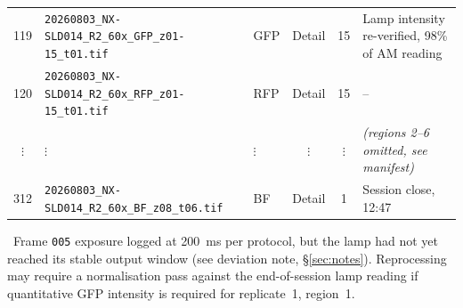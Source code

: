 \begin{center}
\begin{tabularx}{\linewidth}{@{}c l l c c X@{}}
119 & \texttt{20260803\_NX-SLD014\_R2\_60x\_GFP\_z01-15\_t01.tif}  & GFP  & Detail & 15 & Lamp intensity re-verified, 98\% of AM reading \\
\rowcolor{mistgray}
120 & \texttt{20260803\_NX-SLD014\_R2\_60x\_RFP\_z01-15\_t01.tif}  & RFP  & Detail & 15 & -- \\
$\vdots$ & $\vdots$ & $\vdots$ & $\vdots$ & $\vdots$ & \textit{(regions 2--6 omitted, see manifest)} \\
312 & \texttt{20260803\_NX-SLD014\_R2\_60x\_BF\_z08\_t06.tif} & BF & Detail & 1  & Session close, 12:47 \\
\bottomrule
\end{tabularx}
\end{center}

\begin{tcolorbox}[flagbox]
\faExclamationTriangle\ Frame \texttt{005} exposure logged at 200~ms per protocol,
but the lamp had not yet reached its stable output window (see deviation note,
\S\ref{sec:notes}). Reprocessing may require a normalisation pass against the
end-of-session lamp reading if quantitative GFP intensity is required for
replicate~1, region~1.
\end{tcolorbox}
